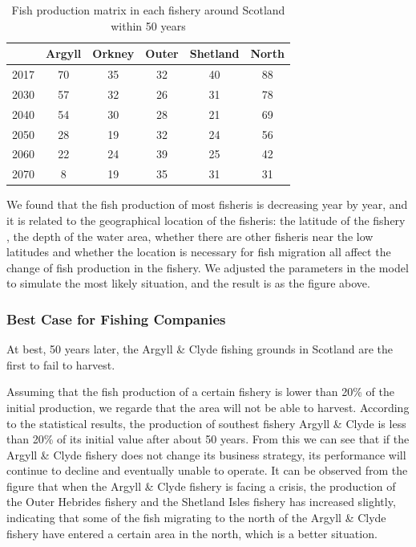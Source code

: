 \documentclass{mcmthesis}
\numberwithin{figure}{section}
\numberwithin{table}{section}
\begin{document}
\begin{table}[!htbp]
  \centering
  \begin{tabular}{|r|c|c|c|c|c|}%
  \hline  %
   & \textbf{Argyll} & \textbf{Orkney} & \textbf{Outer} & \textbf{Shetland} &\textbf{North}\\
  \hline %
  2017 & 70 &35 &32&40&88\\
  \hline %
  2030 & 57&32&26&31&78\\
  \hline %
  2040  & 54&30&28&21&69\\
  \hline %
  2050 &28&19&32&24&56\\
  \hline %
  2060 &22&24&39&25&42\\
  \hline %
  2070 &8&19&35&31&31\\
  \hline %
  \end{tabular}
  \caption{Fish production matrix in each fishery around Scotland within 50 years}
  \label{FisheryTable}
  \end{table}

We found that the fish production of most fisheris is decreasing year by year, and it is related to the geographical location of the fisheris: the latitude of the fishery , the depth of the water area, whether there are other fisheris near the low latitudes and  whether the location is necessary for fish migration all affect the change of fish production in the fishery. We adjusted the parameters in the model to simulate the most likely situation, and the result is as the figure above.


\subsubsection{Best Case for Fishing Companies}

At best, 50 years later, the Argyll \& Clyde fishing grounds in Scotland are the first to fail to harvest.

Assuming that the fish production of a certain fishery is lower than 20\% of the initial production, we regarde that the area will not be able to harvest. According to the statistical results, the production of southest fishery Argyll \& Clyde is less than 20\% of its initial value after about 50 years. From this we can see that if the Argyll \& Clyde fishery does not change its business strategy, its performance will continue to decline and eventually unable to operate. It can be observed from the figure that when the Argyll \& Clyde fishery is facing a crisis, the production of the Outer Hebrides fishery and the Shetland Isles fishery has increased slightly, indicating that some of the fish migrating to the north of the Argyll \& Clyde fishery have entered a certain area in the north, which is a better situation.
\end{document}
